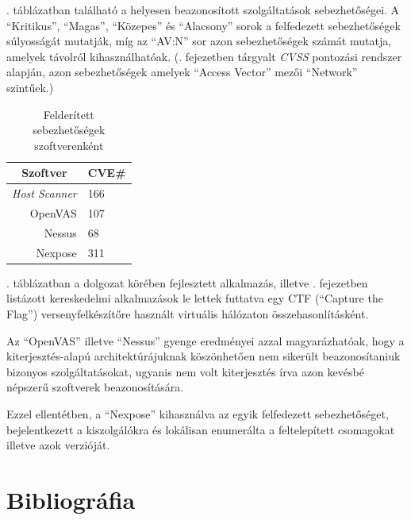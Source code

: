 \documentclass[a4paper,12pt]{article}
\begin{document}
	\Az{\ref{cpevulns}}. táblázatban található a helyesen beazonosított szolgáltatások sebezhetőségei. A ``Kritikus'', ``Magas'', ``Közepes'' és ``Alacsony'' sorok a felfedezett sebezhetőségek súlyosságát mutatják, míg az ``AV:N'' sor azon sebezhetőségek számát mutatja, amelyek távolról kihasználhatóak. (\Az{\ref{ssec:cvss}}. fejezetben tárgyalt \textit{CVSS} pontozási rendszer alapján, azon sebezhetőségek amelyek ``Access Vector'' mezői ``Network'' szintűek.)
	
	\begin{table}[H]
		\centering
		\begin{tabular}{|r|l|}
			\hline
			\multicolumn{1}{|c|}{\textbf{Szoftver}} & \multicolumn{1}{c|}{\textbf{CVE\#}} \\ \hline
			\textit{Host Scanner}                   & 166                                 \\
			OpenVAS                                 & 107                                 \\
			Nessus                                  & 68                                  \\
			Nexpose                                 & 311                                 \\ \hline
		\end{tabular}
		\caption{Felderített sebezhetőségek szoftverenként}
		\label{foundvulns}
	\end{table}
	
	\Az{\ref{foundvulns}}. táblázatban a dolgozat körében fejlesztett alkalmazás, illetve \az{\ref{ssec:comtools}}. fejezetben listázott kereskedelmi alkalmazások le lettek futtatva egy CTF (``Capture the Flag'') versenyfelkészítőre használt virtuális hálózaton összehasonlításként.
	
	Az ``OpenVAS'' illetve ``Nessus'' gyenge eredményei azzal magyarázhatóak, hogy a kiterjesztés-alapú architektúrájuknak köszönhetően nem sikerült beazonosítaniuk bizonyos szolgáltatásokat, ugyanis nem volt kiterjesztés írva azon kevésbé népszerű szoftverek beazonosítására.
	
	Ezzel ellentétben, a ``Nexpose'' kihasználva az egyik felfedezett sebezhetőséget, bejelentkezett a kiszolgálókra és lokálisan enumerálta a feltelepített csomagokat illetve azok verzióját.

\section{Bibliográfia}

	\begingroup
	\renewcommand{\section}[2]{}
	\renewcommand{\markboth}[2]{}
		
		
	\endgroup
\end{document}
